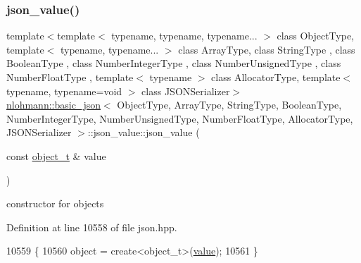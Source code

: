 \subsubsection{\texorpdfstring{json\+\_\+value()}{json\_value()}\hspace{0.1cm}{\footnotesize\ttfamily [9/12]}}
{\footnotesize\ttfamily template$<$template$<$ typename, typename, typename... $>$ class Object\+Type, template$<$ typename, typename... $>$ class Array\+Type, class String\+Type , class Boolean\+Type , class Number\+Integer\+Type , class Number\+Unsigned\+Type , class Number\+Float\+Type , template$<$ typename $>$ class Allocator\+Type, template$<$ typename, typename=void $>$ class J\+S\+O\+N\+Serializer$>$ \\
\hyperlink{classnlohmann_1_1basic__json}{nlohmann\+::basic\+\_\+json}$<$ Object\+Type, Array\+Type, String\+Type, Boolean\+Type, Number\+Integer\+Type, Number\+Unsigned\+Type, Number\+Float\+Type, Allocator\+Type, J\+S\+O\+N\+Serializer $>$\+::json\+\_\+value\+::json\+\_\+value (\begin{DoxyParamCaption}\item[{const \hyperlink{classnlohmann_1_1basic__json_a5e48a7893520e1314bf0c9723e26ea2a}{object\+\_\+t} \&}]{value }\end{DoxyParamCaption})\hspace{0.3cm}{\ttfamily [inline]}}



constructor for objects 



Definition at line 10558 of file json.\+hpp.


\begin{DoxyCode}
10559         \{
10560             \textcolor{keywordtype}{object} = create<object\_t>(\hyperlink{classnlohmann_1_1basic__json_adcf8ca5079f5db993820bf50036bf45d}{value});
10561         \}
\end{DoxyCode}
\mbox{\label{unionnlohmann_1_1basic__json_1_1json__value_a82815d53bd7c983995fbcbe85131a110}} 
